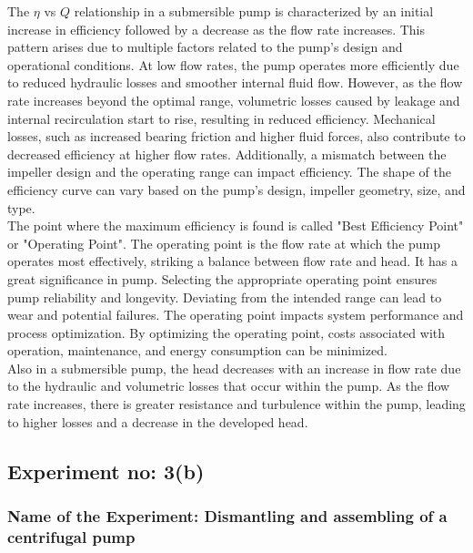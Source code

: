 \documentclass[12pt]{article}
\begin{document}
The $\eta$ vs $Q$ relationship in a submersible pump is characterized by an initial increase in efficiency followed by a decrease as the flow rate increases. This pattern arises due to multiple factors related to the pump's design and operational conditions. At low flow rates, the pump operates more efficiently due to reduced hydraulic losses and smoother internal fluid flow. However, as the flow rate increases beyond the optimal range, volumetric losses caused by leakage and internal recirculation start to rise, resulting in reduced efficiency. Mechanical losses, such as increased bearing friction and higher fluid forces, also contribute to decreased efficiency at higher flow rates. Additionally, a mismatch between the impeller design and the operating range can impact efficiency. The shape of the efficiency curve can vary based on the pump's design, impeller geometry, size, and type. \\


The point where the maximum efficiency is found is called "Best Efficiency Point" or "Operating Point". The operating point is the flow rate at which the pump operates most effectively, striking a balance between flow rate and head. It has a great significance in pump. Selecting the appropriate operating point ensures pump reliability and longevity. Deviating from the intended range can lead to wear and potential failures. The operating point impacts system performance and process optimization. By optimizing the operating point, costs associated with operation, maintenance, and energy consumption can be minimized.\\

Also in a submersible pump, the head decreases with an increase in flow rate due to the hydraulic and volumetric losses that occur within the pump. As the flow rate increases, there is greater resistance and turbulence within the pump, leading to higher losses and a decrease in the developed head.

\pagebreak

\subsection*{Experiment no: 3(b)}
\subsubsection*{Name of the Experiment:  Dismantling and assembling of a centrifugal pump} 
\vspace*{0.2cm}
\end{document}
